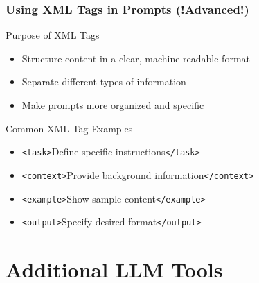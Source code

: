 \documentclass{beamer}
\begin{document}
\begin{frame}
\frametitle{Using XML Tags in Prompts (!Advanced!)}

\begin{block}{Purpose of XML Tags}
\begin{itemize}
\item Structure content in a clear, machine-readable format
\item Separate different types of information
\item Make prompts more organized and specific
\end{itemize}
\end{block}

\begin{exampleblock}{Common XML Tag Examples}
\begin{itemize}
\item \texttt{<task>}Define specific instructions\texttt{</task>}
\item \texttt{<context>}Provide background information\texttt{</context>}
\item \texttt{<example>}Show sample content\texttt{</example>}
\item \texttt{<output>}Specify desired format\texttt{</output>}
\end{itemize}
\end{exampleblock}

\end{frame}

\section{Additional LLM Tools}
\frame{\sectionpage}
\end{document}
